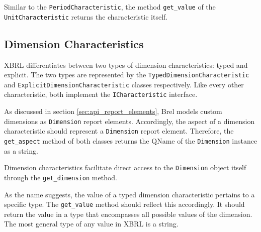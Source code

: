 Similar to the \texttt{PeriodCharacteristic}, the method \texttt{get\_value} of the \texttt{UnitCharacteristic} returns the characteristic itself.


\subsection{Dimension Characteristics}

XBRL differentiates between two types of dimension characteristics: typed and explicit.
The two types are represented by the \texttt{TypedDimensionCharacteristic} and \texttt{ExplicitDimensionCharacteristic} classes respectively.
Like every other characteristic, both implement the \texttt{ICharacteristic} interface.

As discussed in section \ref{sec:api_report_elements}, Brel models custom dimensions as \texttt{Dimension} report elements.
Accordingly, the aspect of a dimension characteristic should represent a \texttt{Dimension} report element.
Therefore, the \texttt{get\_aspect} method of both classes returns the QName of the \texttt{Dimension} instance as a string.

Dimension characteristics facilitate direct access to the \texttt{Dimension} object itself through the \texttt{get\_dimension} method.

As the name suggests, the value of a typed dimension characteristic pertains to a specific type.
The \texttt{get\_value} method should reflect this accordingly.
It should return the value in a type that encompasses all possible values of the dimension.
The most general type of any value in XBRL is a string.

